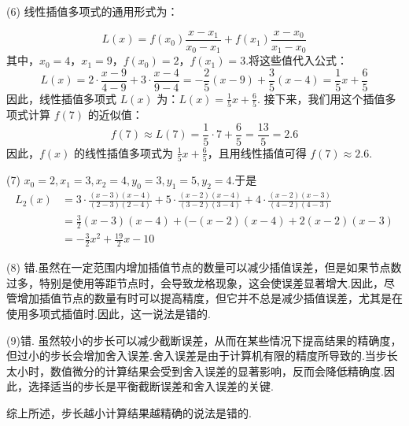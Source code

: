 \vspace{\baselineskip}

(6) 线性插值多项式的通用形式为：

$$
L(x) = f(x_0) \frac{x - x_1}{x_0 - x_1} + f(x_1) \frac{x - x_0}{x_1 - x_0}
$$
其中，$ x_0 = 4 $，$ x_1 = 9 $，$ f(x_0) = 2 $，$ f(x_1) = 3 $.将这些值代入公式：
$$
L(x) = 2\cdot  \frac{x - 9}{4 - 9} + 3\cdot  \frac{x - 4}{9 - 4} = -\frac{2}{5} (x - 9) + \frac{3}{5} (x - 4) = \frac{1}{5} x + \frac{6}{5}
$$
因此，线性插值多项式 $ L(x) $ 为：$L(x) = \frac{1}{5} x + \frac{6}{5}$.
接下来，我们用这个插值多项式计算 $ f(7) $ 的近似值：
$$
f(7) \approx L(7) = \frac{1}{5} \cdot 7 + \frac{6}{5} = \frac{13}{5} = 2.6
$$
因此，$ f(x) $ 的线性插值多项式为 $ \frac{1}{5} x + \frac{6}{5} $，且用线性插值可得 $ f(7) \approx 2.6 $.

\vspace{\baselineskip}

(7) $x_{0}  =2, x_{1}=3, x_{2}=4 , y_{0}  =3, y_{1}=5, y_{2}=4 $.于是
$$
\begin{aligned}
L_{2}(x) & =3 \cdot \frac{(x-3)(x-4)}{(2-3)(2-4)}+5 \cdot \frac{(x-2)(x-4)}{(3-2)(3-4)}+4 \cdot \frac{(x-2)(x-3)}{(4-2)(4-3)} \\
& =\frac 32 (x-3)(x-4)+(-(x-2)(x-4)+2(x-2)(x-3) \\
& =-\frac{3}{2} x^{2}+\frac{19}{2} x-10
\end{aligned}
$$

\vspace{\baselineskip}

(8) 错.虽然在一定范围内增加插值节点的数量可以减少插值误差，但是如果节点数过多，特别是使用等距节点时，会导致龙格现象，这会使误差显著增大.因此，尽管增加插值节点的数量有时可以提高精度，但它并不总是减少插值误差，尤其是在使用多项式插值时.因此，这一说法是错的.

\vspace{\baselineskip}

(9)错. 虽然较小的步长可以减少截断误差，从而在某些情况下提高结果的精确度，但过小的步长会增加舍入误差.舍入误差是由于计算机有限的精度所导致的.当步长太小时，数值微分的计算结果会受到舍入误差的显著影响，反而会降低精确度.因此，选择适当的步长是平衡截断误差和舍入误差的关键.

综上所述，步长越小计算结果越精确的说法是错的.